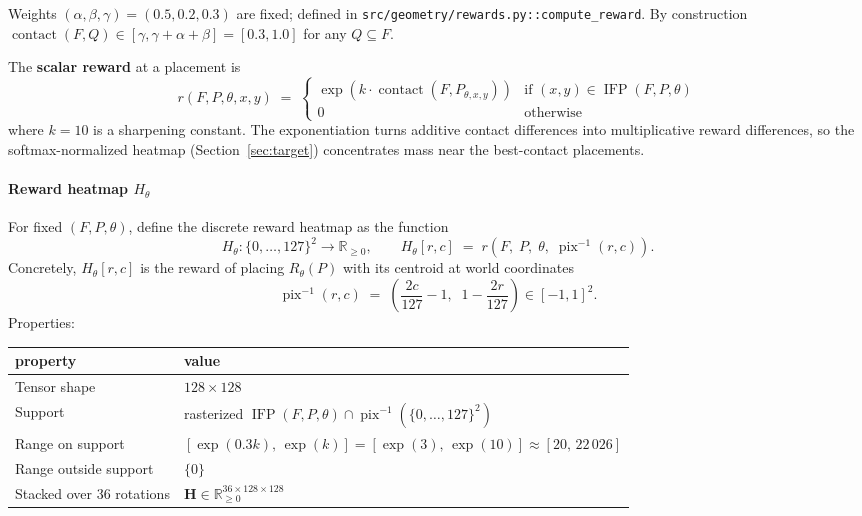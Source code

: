 \documentclass[11pt]{article}
\newcommand{\code}[1]{\texttt{#1}}
\begin{document}
Weights $(\alpha, \beta, \gamma) = (0.5, 0.2, 0.3)$ are fixed; defined in \code{src/geometry/rewards.py::compute\_reward}.  By construction $\operatorname{contact}(F, Q) \in [\gamma, \gamma + \alpha + \beta] = [0.3, 1.0]$ for any $Q \subseteq F$.

The \textbf{scalar reward} at a placement is
\[
  r(F, P, \theta, x, y) \;=\;
  \begin{cases}
    \exp\!\left(k \cdot \operatorname{contact}(F, P_{\theta,x,y})\right) & \text{if } (x,y) \in \operatorname{IFP}(F,P,\theta) \\
    0 & \text{otherwise}
  \end{cases}
\]
where $k = 10$ is a sharpening constant.  The exponentiation turns additive contact differences into multiplicative reward differences, so the softmax-normalized heatmap (Section~\ref{sec:target}) concentrates mass near the best-contact placements.

\paragraph{Reward heatmap $H_\theta$}
For fixed $(F, P, \theta)$, define the discrete reward heatmap as the function
\[
  H_\theta : \{0, \dots, 127\}^2 \to \mathbb{R}_{\geq 0}, \qquad H_\theta[r, c] \;=\; r\!\left(F,\; P,\; \theta,\; \operatorname{pix}^{-1}(r, c)\right).
\]
Concretely, $H_\theta[r, c]$ is the reward of placing $R_\theta(P)$ with its centroid at world coordinates
\[
  \operatorname{pix}^{-1}(r, c) \;=\; \left(\frac{2c}{127} - 1,\;\; 1 - \frac{2r}{127}\right) \in [-1, 1]^2.
\]
Properties:

\begin{center}
\begin{tabular}{ll}
  \toprule
  property & value \\
  \midrule
  Tensor shape                & $128 \times 128$ \\
  Support                     & rasterized $\operatorname{IFP}(F, P, \theta) \cap \operatorname{pix}^{-1}(\{0,\dots,127\}^2)$ \\
  Range on support            & $[\exp(0.3 k),\, \exp(k)] = [\exp(3),\, \exp(10)] \approx [20,\, 22\,026]$ \\
  Range outside support       & $\{0\}$ \\
  Stacked over 36 rotations   & $\mathbf{H} \in \mathbb{R}_{\geq 0}^{36 \times 128 \times 128}$ \\
  \bottomrule
\end{tabular}
\end{center}
\end{document}
